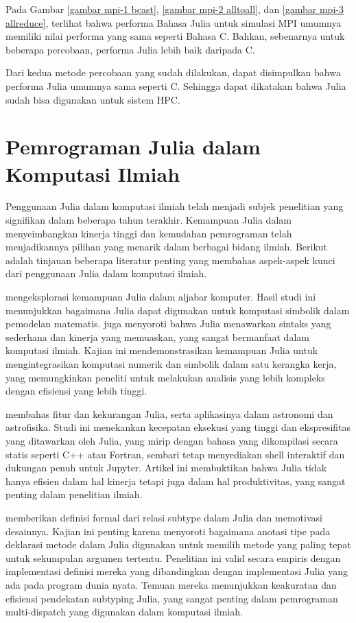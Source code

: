 Pada Gambar \ref{gambar mpi-1 bcast}, \ref{gambar mpi-2 alltoall}, dan
\ref{gambar mpi-3 allreduce}, terlihat bahwa performa Bahasa Julia untuk simulasi
MPI umumnya memiliki nilai performa yang sama seperti Bahasa C. Bahkan, sebenarnya
untuk beberapa percobaan, performa Julia lebih baik daripada C.

Dari kedua metode percobaan yang sudah dilakukan, dapat disimpulkan bahwa performa
Julia umumnya sama seperti C. Sehingga dapat dikatakan bahwa Julia sudah bisa
digunakan untuk sistem HPC.

\section{Pemrograman Julia dalam Komputasi Ilmiah}

Penggunaan Julia dalam komputasi ilmiah telah menjadi subjek penelitian yang signifikan
dalam beberapa tahun terakhir. Kemampuan Julia dalam menyeimbangkan kinerja
tinggi dan kemudahan pemrograman telah menjadikannya pilihan yang menarik dalam
berbagai bidang ilmiah. Berikut adalah tinjauan beberapa literatur penting yang membahas
aspek-aspek kunci dari penggunaan Julia dalam komputasi ilmiah.

\cite{kulyabovComputerAlgebraJULIA2021} mengeksplorasi kemampuan Julia dalam aljabar
komputer. Hasil studi ini menunjukkan bagaimana Julia dapat digunakan untuk
komputasi simbolik dalam pemodelan matematis. \cite{kulyabovComputerAlgebraJULIA2021}
juga menyoroti bahwa Julia menawarkan sintaks yang sederhana dan kinerja yang memuaskan,
yang sangat bermanfaat dalam komputasi ilmiah. Kajian ini mendemonstrasikan kemampuan
Julia untuk mengintegrasikan komputasi numerik dan simbolik dalam satu kerangka kerja,
yang memungkinkan peneliti untuk melakukan analisis yang lebih kompleks dengan
efisiensi yang lebih tinggi.

\cite{tomasiNewSolutionsScientific2018} membahas fitur dan kekurangan Julia, serta
aplikasinya dalam astronomi dan astrofisika. Studi ini menekankan kecepatan
eksekusi yang tinggi dan ekspresifitas yang ditawarkan oleh Julia, yang mirip dengan
bahasa yang dikompilasi secara statis seperti C++ atau Fortran, sembari tetap
menyediakan shell interaktif dan dukungan penuh untuk Jupyter. Artikel ini membuktikan
bahwa Julia tidak hanya efisien dalam hal kinerja tetapi juga dalam hal produktivitas,
yang sangat penting dalam penelitian ilmiah.

\cite{zappanardelliJuliaSubtypingRational2018} memberikan definisi formal dari
relasi subtype dalam Julia dan memotivasi desainnya. Kajian ini penting karena menyoroti
bagaimana anotasi tipe pada deklarasi metode dalam Julia digunakan untuk memilih
metode yang paling tepat untuk sekumpulan argumen tertentu. Penelitian ini valid
secara empiris dengan implementasi definisi mereka yang dibandingkan dengan
implementasi Julia yang ada pada program dunia nyata. Temuan mereka menunjukkan keakuratan
dan efisiensi pendekatan subtyping Julia, yang sangat penting dalam pemrograman
multi-dispatch yang digunakan dalam komputasi ilmiah.

